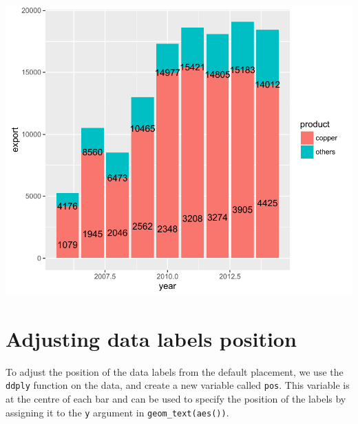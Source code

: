 \begin{center}\includegraphics[width=0.6\linewidth]{3_Bar_Plots_pdf/bar_2-1} \end{center}

\section{Adjusting data labels
position}\label{adjusting-data-labels-position}

To adjust the position of the data labels from the default placement, we
use the \texttt{ddply} function on the data, and create a new variable
called \texttt{pos}. This variable is at the centre of each bar and can
be used to specify the position of the labels by assigning it to the
\texttt{y} argument in \texttt{geom\_text(aes())}.

\begin{Shaded}
\begin{Highlighting}[]
\StringTok{ }
   \StringTok{ }\NormalTok{(} \NormalTok{*}\StringTok{ }

\StringTok{ }\NormalTok{() +}\StringTok{ }\NormalTok{(}\NormalTok{(}   
   \NormalTok{) }
\StringTok{ }\StringTok{ }\NormalTok{(}\NormalTok{(}   
  \NormalTok{)}
\end{Highlighting}
\end{Shaded}

